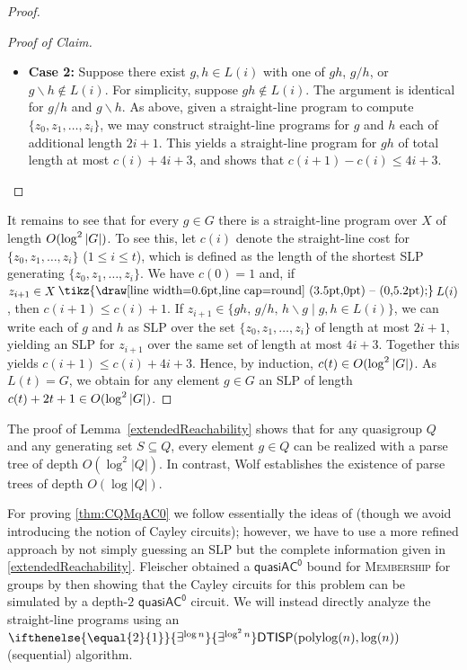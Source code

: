 \documentclass{theoretics}
\newcommand{\algprobm}[1]{\textsc{#1}\xspace}
\newcommand{\betacc}[1]{\ifthenelse{\equal{#1}{1}}{\exists^{\log n}}{\exists^{\log^{#1}n}}} %
\newcommand{\abs}[1]{\left|\mathinner{#1}\right|}
\renewcommand{\setminus}{\mysetminus}
\newcommand{\mysetminusD}{\raisebox{.8pt}{\hbox{\tikz{\draw[line width=0.6pt,line cap=round] (3.5pt,0pt) -- (0,5.2pt);}}}}
\newcommand{\mysetminusT}{\mysetminusD}
\newcommand{\mysetminusS}{\raisebox{.5pt}{\hbox{\tikz{\draw[line width=0.45pt,line cap=round] (2.2pt,0) -- (0,3.8pt);}}}}
\newcommand{\mysetminusSS}{\raisebox{.35pt}{\hbox{\tikz{\draw[line width=0.4pt,line cap=round] (1.5pt,0) -- (0,2.8pt);}}}}
\newcommand{\mysetminus}{\mathbin{\mathchoice{\mysetminusD}{\mysetminusT}{\mysetminusS}{\mysetminusSS}}}
\newcommand*{\ComplexityClass}[1]{\ensuremath{\mathsf{#1}}\xspace}
\newcommand{\DTISP}{\ComplexityClass{DTISP}}
\newcommand{\DTISPpll}{\ensuremath{\DTISP(\mathrm{polylog}(n),\mathrm{log}(n))}\xspace}
\newcommand{\qACz}{\ComplexityClass{quasiAC^0}}
\begin{document}
\begin{proof}
\begin{proof}[Proof of Claim]
\begin{itemize}
    \item \textbf{Case 2:} Suppose there exist $g,h \in L(i)$ with one of $gh$, $g/h$, or $g\backslash h \not \in L(i)$. For simplicity, suppose $gh \not \in L(i).$ The argument is identical for $g/h$ and  $g\backslash h$. As above, given a straight-line program to compute $\{z_0, z_1, \ldots, z_i\}$, we may construct straight-line programs for $g$ and $h$ each of additional length $2i+1$. This yields a straight-line program for $gh$ of total length at most $c(i) + 4i+3$, and shows that $c(i+1) - c(i) \leq 4i+3$.\qedhere 
\end{itemize} 
\end{proof}

\fi

It remains to see that for every $g \in G$ there is a straight-line program over $X$ of length $O(\log^2 \abs{G})$. 
%
To see this, let $c(i)$ denote the straight-line cost for $\{z_0,z_{1}, \ldots, z_{i}\}$ ($1\leq i \leq t$), which is defined as the length of the shortest SLP generating $\{z_0,z_{1}, \ldots, z_{i}\}$. 
%
We have $c(0) = 1$ and, if $z_{i+1} \in X \setminus L(i)$, then $c(i+1) \leq c(i) + 1$. 
%
If $z_{i+1} \in \{ gh,\, g/h,\, h\backslash g\mid g,h \in L(i)\}$, we can write each of $g$ and $h$ as SLP over the set $\{z_0,z_{1}, \ldots, z_{i}\}$ of length at most $2i + 1$, yielding an SLP for $z_{i+1} $ over the same set of length at most $4i+3$. Together this yields $c(i+1) \leq c(i) + 4i+3$.
 Hence, by induction, $c(t) \in O(\log ^2\abs{G})$. As $L(t)= G$, we obtain for any element $g \in G$ an SLP of length $c(t) + 2t+1\in O(\log^2\abs{G})$. 
\end{proof}


\begin{remark}
The proof of Lemma~\ref{extendedReachability} shows that for any quasigroup $Q$ and any generating set $S \subseteq Q$, every element $g \in Q$ can be realized with a parse tree of depth $O(\log^2 |Q|)$. In contrast, Wolf \cite{Wolf} establishes the existence of parse trees of depth $O(\log |Q|)$.   
\end{remark}

For proving \cref{thm:CQMqAC0} we follow essentially the ideas of \cite{Fleischer} (though we avoid introducing the notion of Cayley circuits); however, we have to use a more refined approach by not simply guessing an SLP but the complete information given in \cref{extendedReachability}. Fleischer obtained a $\qACz$ bound for \algprobm{Membership} for groups by then showing that the Cayley circuits for this problem can be simulated by a depth-$2$ $\qACz$ circuit. We will instead directly analyze the straight-line programs using an $\betacc{2}\DTISPpll$ (sequential) algorithm.
\end{document}
